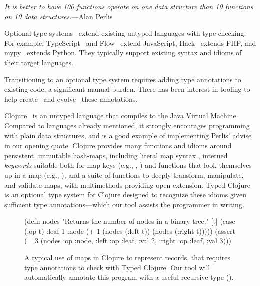 
\emph{It is better to have 100 functions operate on one data structure than 10 functions on 10 data structures.}---Alan Perlis

Optional type systems~\cite{bracha2004pluggable} extend existing untyped languages
with type checking.
For example,
TypeScript~\cite{typescript} and Flow~\cite{flow} extend
JavaScript,
Hack~\cite{hack} extends PHP,
and
mypy~\cite{mypy} extends Python.
They typically support existing syntax and idioms of their target languages.

Transitioning to an optional type system
requires adding type annotations to existing code,
a significant manual burden.
There has been interest in 
tooling to help create~\cite{saftoiu2010jstrace,pyannotate,typette18,An10dynamicinference,pytype} and
evolve~\cite{kristensen2017inference}
these annotations.

Clojure~\cite{Hic08} is an untyped language that compiles to the Java
Virtual Machine. Compared to languages already mentioned, it
strongly encourages programming with plain data structures, and is
a good example of implementing Perlis' advise in our opening quote.
Clojure provides
many functions and idioms around persistent, immutable hash-maps,
including literal map syntax , interned \emph{keywords}
suitable both for map keys (e.g., , ) and
functions that look themselves up in a map (e.g., ),
and a suite of functions to deeply transform, manipulate, and validate
maps, with multimethods providing open extension.
Typed Clojure~\cite{bonnaire2016practical} is an optional type system for Clojure
designed to recognize these idioms given sufficient type annotations---which our
tool assists the programmer in writing.

\begin{figure}
\begin{cljlisting}
(defn nodes
  "Returns the number of nodes in a binary tree."
  [t] (case (:op t)
        :leaf 1
        :node (+ 1 (nodes (:left t))
                   (nodes (:right t)))))
(assert (= 3 (nodes
               {:op :node,
                :left {:op :leaf, :val 2},
                :right {:op :leaf, :val 3}})))
\end{cljlisting}
\caption{A typical use of maps in Clojure
to represent records,
that requires type annotations
to check with Typed Clojure.
Our tool %
will automatically annotate this program
with a useful recursive type ().
}
\label{fig:infer:nodes}
\end{figure}

